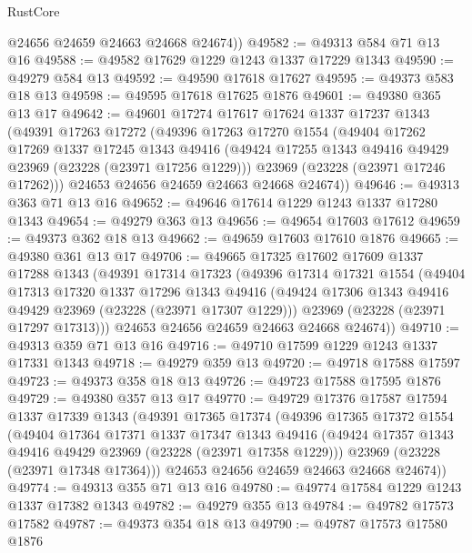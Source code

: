 \begin{lexlean}{RustCore}
\begin{coremodule}
        @24656
        @24659
        @24663
        @24668
        @24674))
@49582 := @49313 @584 @71 @13 @16
@49588 := @49582 @17629 @1229 @1243 @1337 @17229 @1343
@49590 := @49279 @584 @13
@49592 := @49590 @17618 @17627
@49595 := @49373 @583 @18 @13
@49598 := @49595 @17618 @17625 @1876
@49601 := @49380 @365 @13 @17
@49642 := @49601
    @17274
    @17617
    @17624
    @1337
    @17237
    @1343
    (@49391
      @17263
      @17272
      (@49396
        @17263
        @17270
        @1554
        (@49404
          @17262
          @17269
          @1337
          @17245
          @1343
          @49416
          (@49424 @17255 @1343 @49416 @49429 @23969 (@23228 (@23971 @17256 @1229)))
          @23969
          (@23228 (@23971 @17246 @17262)))
        @24653
        @24656
        @24659
        @24663
        @24668
        @24674))
@49646 := @49313 @363 @71 @13 @16
@49652 := @49646 @17614 @1229 @1243 @1337 @17280 @1343
@49654 := @49279 @363 @13
@49656 := @49654 @17603 @17612
@49659 := @49373 @362 @18 @13
@49662 := @49659 @17603 @17610 @1876
@49665 := @49380 @361 @13 @17
@49706 := @49665
    @17325
    @17602
    @17609
    @1337
    @17288
    @1343
    (@49391
      @17314
      @17323
      (@49396
        @17314
        @17321
        @1554
        (@49404
          @17313
          @17320
          @1337
          @17296
          @1343
          @49416
          (@49424 @17306 @1343 @49416 @49429 @23969 (@23228 (@23971 @17307 @1229)))
          @23969
          (@23228 (@23971 @17297 @17313)))
        @24653
        @24656
        @24659
        @24663
        @24668
        @24674))
@49710 := @49313 @359 @71 @13 @16
@49716 := @49710 @17599 @1229 @1243 @1337 @17331 @1343
@49718 := @49279 @359 @13
@49720 := @49718 @17588 @17597
@49723 := @49373 @358 @18 @13
@49726 := @49723 @17588 @17595 @1876
@49729 := @49380 @357 @13 @17
@49770 := @49729
    @17376
    @17587
    @17594
    @1337
    @17339
    @1343
    (@49391
      @17365
      @17374
      (@49396
        @17365
        @17372
        @1554
        (@49404
          @17364
          @17371
          @1337
          @17347
          @1343
          @49416
          (@49424 @17357 @1343 @49416 @49429 @23969 (@23228 (@23971 @17358 @1229)))
          @23969
          (@23228 (@23971 @17348 @17364)))
        @24653
        @24656
        @24659
        @24663
        @24668
        @24674))
@49774 := @49313 @355 @71 @13 @16
@49780 := @49774 @17584 @1229 @1243 @1337 @17382 @1343
@49782 := @49279 @355 @13
@49784 := @49782 @17573 @17582
@49787 := @49373 @354 @18 @13
@49790 := @49787 @17573 @17580 @1876

\end{coremodule}
\end{lexlean}
